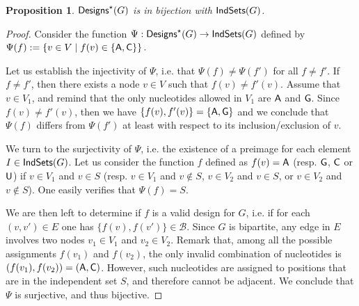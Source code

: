 \documentclass{bioinfo}
\newtheorem{proposition}[theorem]{Proposition}
\newcommand{\B}{\mathcal{B}}
\newcommand{\Design}[1]{{\sf Designs}^{\star}(#1)}
\newcommand{\IS}[1]{{\sf IndSets}(#1)}
\newcommand{\Nuc}[1]{{\sf #1}}
\newcommand{\Ab}{\Nuc{A}}
\newcommand{\Cb}{\Nuc{C}}
\newcommand{\Gb}{\Nuc{G}}
\newcommand{\Ub}{\Nuc{U}}
\begin{document}
\begin{proposition}
 $\Design{G}$ is in bijection with $\IS{G}$.
\end{proposition}
\begin{proof}
Consider the function $\Psi: \Design{G} \to \IS{G}$ defined by $ \Psi(f) := \left\{v\in V\mid f(v)\in\{\Ab,\Cb\}\right\}.$

Let us establish the injectivity of  $\Psi$, i.e. that $\Psi(f)\neq\Psi(f')$ for all $f\neq f'$.
If $f\neq f'$, then there exists a node $v\in V$ such that $f(v)\neq f'(v)$.
Assume that $v\in V_1$, and remind that the only nucleotides allowed in $V_1$ are $\Ab$ and $\Gb$. Since $f(v)\neq f'(v)$, then we have $\{f(v),f'(v)\}=\{\Ab,\Gb\}$
and we conclude that $\Psi(f)$ differs from $\Psi(f')$ at least with respect to its inclusion/exclusion of $v$.

We turn to the surjectivity of $\Psi$, i.e. the existence of a preimage for each element $I\in \IS{G}$. Let us consider the function $f$ defined as $f(v) = \Ab$ (resp. $\Gb$, $\Cb$ or $\Ub$) if $v\in V_1$ and $v\in S$ (resp. $v\in V_1$ and $v\notin S$, $v\in V_2$ and $v\in S$, or $v\in V_2$ and $v\notin S$).
%
One easily verifies that $\Psi(f) = S$.

We are then left to determine if $f$ is a valid design for $G$, i.e. if for each $(v, v') \in E$ one has  $\{f(v),f(v')\}\in \B.$ Since $G$ is bipartite, any edge in $E$ involves two nodes $v_1\in V_1$ and $v_2\in V_2$. Remark that, among all the possible assignments $f(v_1)$ and $f(v_2)$, the only invalid combination of nucleotides is $(f(v_1),f(v_2)) = (\Ab,\Cb)$. However, such nucleotides are assigned to positions that are in the independent set $S$, and therefore cannot be adjacent. We conclude that $\Psi$ is surjective, and thus bijective.
\end{proof}
\end{document}
